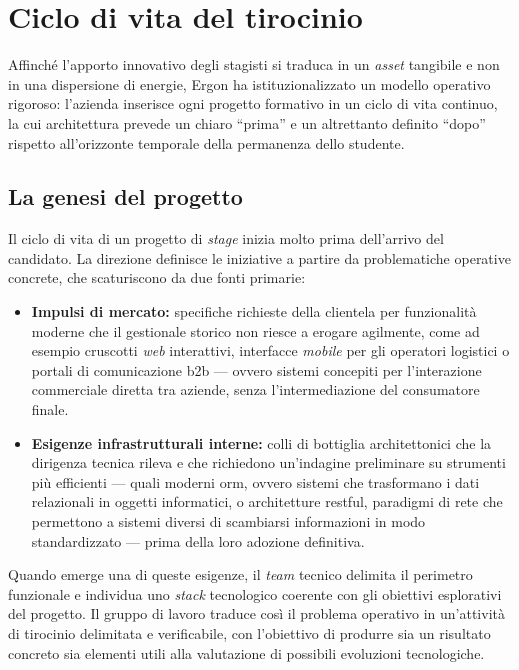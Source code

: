 \section{Ciclo di vita del tirocinio}
\label{sec:ciclo_vita_tirocinio}

Affinché l'apporto innovativo degli stagisti si traduca in un \textit{asset} tangibile e non in una dispersione di energie, Ergon ha istituzionalizzato un modello operativo rigoroso: l'azienda inserisce ogni progetto formativo in un ciclo di vita continuo, la cui architettura prevede un chiaro ``prima'' e un altrettanto definito ``dopo'' rispetto all'orizzonte temporale della permanenza dello studente.

\subsection{La genesi del progetto}
\label{subsec:genesi_necessita}

Il ciclo di vita di un progetto di \textit{stage} inizia molto prima dell'arrivo del candidato. La direzione definisce le iniziative a partire da problematiche operative concrete, che scaturiscono da due fonti primarie: 
\begin{itemize}
    \item \textbf{Impulsi di mercato:} specifiche richieste della clientela per funzionalità moderne che il gestionale storico non riesce a erogare agilmente, come ad esempio cruscotti \textit{web} interattivi, interfacce \textit{mobile} per gli operatori logistici o portali di comunicazione \gls{b2b} --- ovvero sistemi concepiti per l'interazione commerciale diretta tra aziende, senza l'intermediazione del consumatore finale.
    \item \textbf{Esigenze infrastrutturali interne:} colli di bottiglia architettonici che la dirigenza tecnica rileva e che richiedono un'indagine preliminare su strumenti più efficienti --- quali moderni \gls{orm}, ovvero sistemi che trasformano i dati relazionali in oggetti informatici, o architetture \gls{restful}, paradigmi di rete che permettono a sistemi diversi di scambiarsi informazioni in modo standardizzato --- prima della loro adozione definitiva.
\end{itemize}

Quando emerge una di queste esigenze, il \textit{team} tecnico delimita il perimetro funzionale e individua uno \textit{stack} tecnologico coerente con gli obiettivi esplorativi del progetto. Il gruppo di lavoro traduce così il problema operativo in un'attività di tirocinio delimitata e verificabile, con l'obiettivo di produrre sia un risultato concreto sia elementi utili alla valutazione di possibili evoluzioni tecnologiche.

